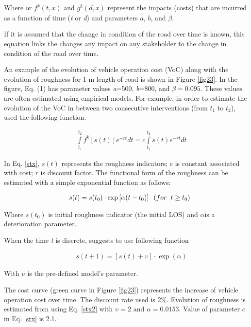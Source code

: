 Where  or ${f^k}(t,x)$ and $g_{}^k(d,x)$ represent the impacts (costs) that are incurred as a function of time (\textit{t} or \textit{d}) and parameters $a$, $b$, and $\beta $.

If it is assumed that the change in condition of the road over time is known, this equation links the changes any impact on any stakeholder to the change in condition of the road over time.  

An example of the evolution of vehicle operation cost (VoC) along with the evolution of roughness for 1 m length of road is shown in Figure \ref{fig23}. In the figure, Eq. (1) has parameter values \textit{a}=500, \textit{b}=800, and $\beta  = 0.095$. These values are often estimated using empirical models. For example, in order to estimate the evolution of the VoC in between two consecutive interventions (from ${t_1}$ to ${t_2}$), \cite{Ouyang2004} used the following function.

\begin{eqnarray}
      && \int\limits_{{t_1}}^{{t_2}} {{f^k}\left[ {s(t)} \right]} {e^{ - rt}}dt = c\int\limits_{{t_1}}^{{t_2}} {s(t){e^{ - rt}}} dt \label{stx}
\end{eqnarray}

In Eq. \eqref{stx}, $s(t)$ represents the roughness indicators; c is constant associated with cost; $r$ is discount factor. The functional form of the roughness can be estimated with a simple exponential function as follows:

\begin{eqnarray}
      && s(t) = s({t_0}) \cdot \exp \left[ {\alpha (t - {t_0})} \right] \hspace{2mm} (for \hspace{2mm} t \ge {t_0}) \label{stx1}
\end{eqnarray}


Where $s({t_0})$ is initial roughness indicator (the initial LOS) and $\alpha $is a deterioration parameter.

When the time \textit{t} is discrete, \cite{Ouyang2004} suggests to use following function

\begin{eqnarray}
      && s(t + 1) = \left[ {s(t) + \upsilon } \right] \cdot \exp (\alpha ) \label{stx2}
\end{eqnarray}

With $\upsilon $ is the pre-defined model's parameter.

The cost curve (green curve in Figure \ref{fig23}) represents the increase of vehicle operation cost over time. The discount rate used is 2\%. Evolution of roughness is estimated from using Eq. \eqref{stx2} with $\upsilon  = 2$ and $\alpha  = 0.0153$. Value of parameter $c$in Eq. \eqref{stx} is 2.1.


